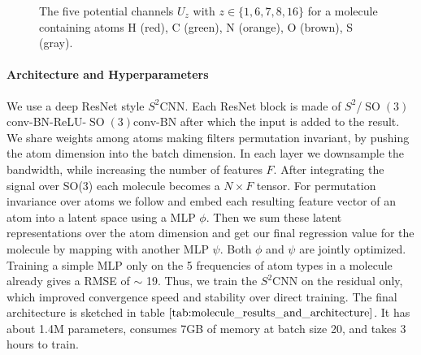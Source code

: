 \documentclass{article} %
\newcommand{\SO}[1]{\ensuremath{\operatorname{SO}(#1)}}
\begin{document}
\begin{figure}
\centering

\end{figure}

\begin{figure}
    \centering
    \caption{\label{fig:molecule_rendering}
        The five potential channels $U_z$ with $z \in \{1,6,7,8,16\}$ for a molecule containing atoms H (red), C (green), N (orange), O (brown), S (gray).}
\end{figure}

\paragraph{Architecture and Hyperparameters}

We use a deep ResNet style $S^2$CNN.
Each ResNet block is made of $S^2$/$\SO3$conv-BN-ReLU-$\SO3$conv-BN after which the input is added to the result.
We share weights among atoms making filters permutation invariant, by pushing the atom dimension into the batch dimension.
In each layer we downsample the bandwidth, while increasing the number of features $F$.
After integrating the signal over SO(3) each molecule becomes a $N \times F$ tensor.
For permutation invariance over atoms we follow \cite{zaheer2017deep} and embed each resulting feature vector of an atom into a latent space using a MLP $\phi$. Then we sum these latent representations over the atom dimension and get our final regression value for the molecule by mapping with another MLP $\psi$. Both $\phi$ and $\psi$ are jointly optimized.
Training a simple MLP only on the 5 frequencies of atom types in a molecule already gives a RMSE of $\sim$ 19.
Thus, we train the $S^2$CNN on the residual only, which improved convergence speed and stability over direct training.
The final architecture is sketched in table $\ref{tab:molecule_results_and_architecture}$.
It has about 1.4M parameters, consumes 7GB of memory at batch size 20, and takes 3 hours to train.
\end{document}

